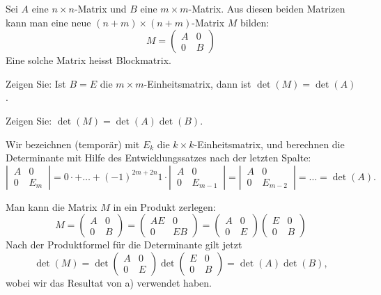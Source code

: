 Sei $A$ eine $n\times n$-Matrix und $B$ eine $m\times m$-Matrix. Aus diesen beiden
Matrizen kann man eine neue $(n+m)\times(n+m)$-Matrix $M$ bilden:
\[
M=\begin{pmatrix}
A&0\\
0&B
\end{pmatrix}
\]
Eine solche Matrix heisst Blockmatrix.
\begin{teilaufgaben}
\item
Zeigen Sie:
Ist $B=E$ die $m\times m$-Einheitsmatrix, dann ist $\det(M)=\det(A)$.
\item
Zeigen Sie:
$\det(M)=\det(A)\det(B)$.
\end{teilaufgaben}


\begin{loesung}
\begin{teilaufgaben}
\item Wir bezeichnen (temporär) mit $E_k$ die $k\times k$-Einheitsmatrix,
und berechnen die Determinante mit Hilfe des Entwicklungssatzes nach der
letzten Spalte:
\[
\left|\,
\begin{matrix}
A&0\\
0&E_m
\end{matrix}
\,\right|
=0\cdot +\dots+(-1)^{2m+2n}1\cdot
\left|\,
\begin{matrix}
A&0\\
0&E_{m-1}
\end{matrix}
\,\right|
=
\left|\,
\begin{matrix}
A&0\\
0&E_{m-2}
\end{matrix}
\,\right|
=\dots=
\det(A).
\]

\item
Man kann die Matrix $M$ in ein Produkt zerlegen:
\[
M=
\begin{pmatrix}
A&0\\
0&B
\end{pmatrix}
=
\begin{pmatrix}
AE&0\\
0&EB
\end{pmatrix}
=
\begin{pmatrix}
A&0\\
0&E
\end{pmatrix}
\begin{pmatrix}
E&0\\
0&B
\end{pmatrix}
\]
Nach der Produktformel für die Determinante gilt jetzt
\[
\det(M) =
\det
\begin{pmatrix}
A&0\\
0&E
\end{pmatrix}
\det
\begin{pmatrix}
E&0\\
0&B
\end{pmatrix}
=\det(A)\det(B),
\]
wobei wir das Resultat von a) verwendet haben.
\qedhere
\end{teilaufgaben}
\end{loesung}

